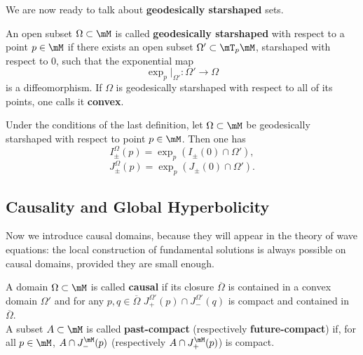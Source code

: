 We are now ready to talk about \textbf{geodesically starshaped} sets.


\begin{definition}
	An open subset $\Omega\subset\mM$ is called \textbf{geodesically starshaped} with respect to a point $p\in\mM$ if there exists an open subset $\Omega'\subset\mT_p\mM$, starshaped with respect to 0, such that the exponential map
	\[	\exp_p|_{\Omega'}:\Omega'\to\Omega		\]
	is a diffeomorphism. If $\Omega$ is geodesically starshaped with respect to all of its points, one calls it \textbf{convex}.
\end{definition}

\begin{prop}
	Under the conditions of the last definition, let $\Omega\subset\mM$ be geodesically starshaped with respect to point $p\in\mM$. Then one has
	\[	I_{\pm}^\Omega(p)=\exp_p(I_{\pm}(0)\cap\Omega'),		\]
	\[	J_{\pm}^\Omega(p)=\exp_p(J_{\pm}(0)\cap\Omega').		\]
\end{prop}

\subsection{Causality and Global Hyperbolicity}



Now we introduce causal domains, because they will appear in the theory of wave equations: the local construction of fundamental solutions is always possible on causal domains, provided they are small enough.


\begin{definition}
	A domain $\Omega\subset\mM$ is called \textbf{causal} if its closure $\overline{\Omega}$ is contained in a convex domain $\Omega'$ and for any $p,q\in\overline{\Omega}$ $J_{+}^{\Omega'}(p)\cap J_{-}^{\Omega'}(q)$ is compact and contained in $\overline{\Omega}$.\\
	A subset $A\subset\mM$ is called \textbf{past-compact} (respectively \textbf{future-compact}) if, for all $p\in\mM$, $A\cap J_-^{\mM}(p)$ (respectively $A\cap J_+^{\mM}(p)$) is compact.
\end{definition}

